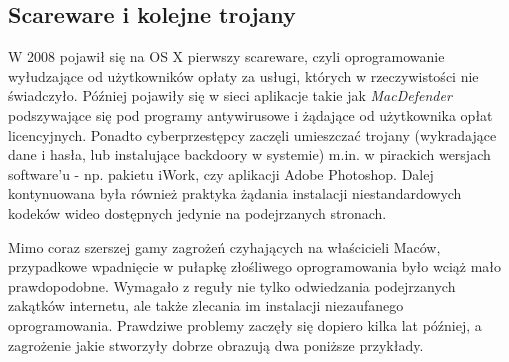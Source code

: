 \documentclass[polish]{kbk}
\begin{document}
\subsection{Scareware i kolejne trojany \cite{history}}
W 2008 pojawił się na OS X pierwszy scareware, czyli oprogramowanie wyłudzające od użytkowników opłaty za usługi, których w rzeczywistości nie świadczyło. Później pojawiły się w sieci aplikacje takie jak \textit{MacDefender} podszywające się pod programy antywirusowe i żądające od użytkownika opłat licencyjnych. Ponadto cyberprzestępcy zaczęli umieszczać trojany (wykradające dane i hasła, lub instalujące backdoory w systemie) m.in. w pirackich wersjach software'u - np. pakietu iWork, czy aplikacji Adobe Photoshop. Dalej kontynuowana była również praktyka żądania instalacji niestandardowych kodeków wideo dostępnych jedynie na podejrzanych stronach. 

Mimo coraz szerszej gamy zagrożeń czyhających na właścicieli Maców, przypadkowe wpadnięcie w pułapkę złośliwego oprogramowania było wciąż mało prawdopodobne. Wymagało z reguły nie tylko odwiedzania podejrzanych zakątków internetu, ale także zlecania im instalacji niezaufanego oprogramowania. Prawdziwe problemy zaczęły się dopiero kilka lat później, a zagrożenie jakie stworzyły dobrze obrazują dwa poniższe przykłady.
\end{document}
